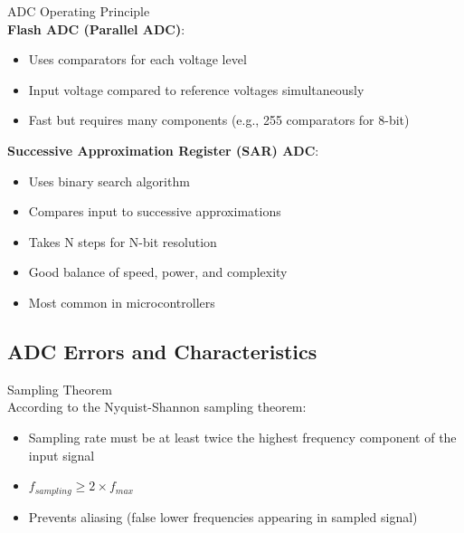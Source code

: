 \begin{concept}{ADC Operating Principle}\\
\textbf{Flash ADC (Parallel ADC)}:
\begin{itemize}
    \item Uses comparators for each voltage level
    \item Input voltage compared to reference voltages simultaneously
    \item Fast but requires many components (e.g., 255 comparators for 8-bit)
\end{itemize}
\textbf{Successive Approximation Register (SAR) ADC}:
\begin{itemize}
    \item Uses binary search algorithm
    \item Compares input to successive approximations
    \item Takes N steps for N-bit resolution
    \item Good balance of speed, power, and complexity
    \item Most common in microcontrollers
\end{itemize}
\end{concept}

\subsection{ADC Errors and Characteristics}

\begin{definition}{Sampling Theorem}\\
According to the Nyquist-Shannon sampling theorem:
\begin{itemize}
    \item Sampling rate must be at least twice the highest frequency component of the input signal
    \item $f_{sampling} \geq 2 \times f_{max}$
    \item Prevents aliasing (false lower frequencies appearing in sampled signal)
\end{itemize}
\end{definition}

